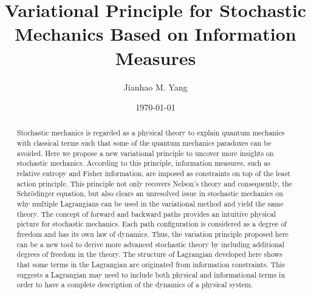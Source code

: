 \documentclass[%
 aip, 
 amsmath,amssymb,amsthm,
 nofootinbib,
 reprint,
]{revtex4-1}
\begin{document}

\title{Variational Principle for Stochastic Mechanics Based on Information Measures}


\author{Jianhao M. Yang}

\date{\today}

\begin{abstract}
Stochastic mechanics is regarded as a physical theory to explain quantum mechanics with classical terms such that some of the quantum mechanics paradoxes can be avoided. Here we propose a new variational principle to uncover more insights on stochastic mechanics. According to this principle, information measures, such as relative entropy and Fisher information, are imposed as constraints on top of the least action principle. This principle not only recovers Nelson's theory and consequently, the Schr\"{o}dinger equation, but also clears an unresolved issue in stochastic mechanics on why multiple Lagrangians can be used in the variational method and yield the same theory. The concept of forward and backward paths provides an intuitive physical picture for stochastic mechanics. Each path configuration is considered as a degree of freedom and has its own law of dynamics. Thus, the variation principle proposed here can be a new tool to derive more advanced stochastic theory by including additional degrees of freedom in the theory. The structure of Lagrangian developed here shows that some terms in the Lagrangian are originated from information constraints. This suggests a Lagrangian may need to include both physical and informational terms in order to have a complete description of the dynamics of a physical system.
\end{abstract}
\maketitle
\end{document}
